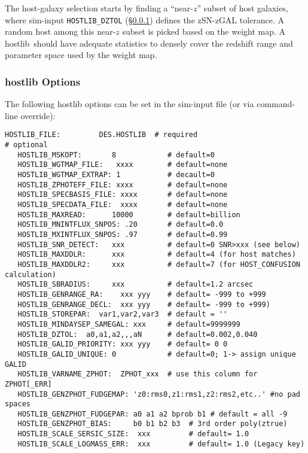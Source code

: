 \documentclass[12pt]{article}
\newcommand{\hostlib}{{\sc hostlib}}
\begin{document}
{The host-galaxy selection starts by finding a ``near-$z$''
subset of host galaxies, where sim-input {\tt HOSTLIB\_DZTOL} 
(\S\ref{sss:hostlib_options})
defines the zSN-zGAL tolerance.
A random host among this near-$z$ subset is 
picked based on the weight map.
A \hostlib\ should have adequate statistics to densely
cover the redshift range and parameter space used by
the weight map.


\clearpage
\subsubsection{{\hostlib} Options}
\label{sss:hostlib_options}

The following {\hostlib} options can be set in
the sim-input file (or via command-line override):
%
\begin{Verbatim}[frame=single]
   HOSTLIB_FILE:         DES.HOSTLIB  # required
# optional
   HOSTLIB_MSKOPT:       8            # default=0
   HOSTLIB_WGTMAP_FILE:   xxxx        # default=none
   HOSTLIB_WGTMAP_EXTRAP: 1           # decault=0
   HOSTLIB_ZPHOTEFF_FILE: xxxx        # default=none
   HOSTLIB_SPECBASIS_FILE: xxxx       # default=none
   HOSTLIB_SPECDATA_FILE:  xxxx       # default=none
   HOSTLIB_MAXREAD:      10000        # default=billion
   HOSTLIB_MNINTFLUX_SNPOS: .20       # default=0.0
   HOSTLIB_MXINTFLUX_SNPOS: .97       # default=0.99
   HOSTLIB_SNR_DETECT:   xxx          # default=0 SNR>xxx (see below)
   HOSTLIB_MAXDDLR:      xxx          # default=4 (for host matches)
   HOSTLIB_MAXDDLR2:     xxx          # default=7 (for HOST_CONFUSION calculation)
   HOSTLIB_SBRADIUS:     xxx          # default=1.2 arcsec
   HOSTLIB_GENRANGE_RA:    xxx yyy    # default= -999 to +999
   HOSTLIB_GENRANGE_DECL:  xxx yyy    # default= -999 to +999)   
   HOSTLIB_STOREPAR:  var1,var2,var3  # default = ''
   HOSTLIB_MINDAYSEP_SAMEGAL: xxx     # default=9999999
   HOSTLIB_DZTOL:  a0,a1,a2,,,aN      # default=0.002,0.040
   HOSTLIB_GALID_PRIORITY: xxx yyy    # default= 0 0 
   HOSTLIB_GALID_UNIQUE: 0            # default=0; 1-> assign unique GALID
   HOSTLIB_VARNAME_ZPHOT:  ZPHOT_xxx  # use this column for ZPHOT[_ERR]
   HOSTLIB_GENZPHOT_FUDGEMAP: 'z0:rms0,z1:rms1,z2:rms2,etc..' #no pad spaces
   HOSTLIB_GENZPHOT_FUDGEPAR: a0 a1 a2 bprob b1 # default = all -9
   HOSTLIB_GENZPHOT_BIAS:     b0 b1 b2 b3  # 3rd order poly(ztrue)
   HOSTLIB_SCALE_SERSIC_SIZE:  xxx         # default= 1.0
   HOSTLIB_SCALE_LOGMASS_ERR:  xxx         # default= 1.0 (Legacy key)

\end{Verbatim}}
\end{document}
